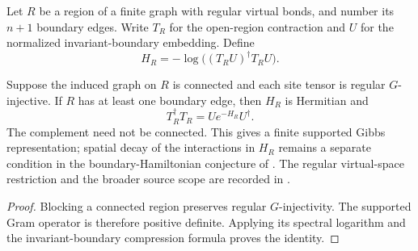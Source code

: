 \begin{definition}%
    \label{def:peps_regular_region_boundary_hamiltonian}
    \leanok
    Let $R$ be a region of a finite graph with regular virtual bonds,
    and number its $n+1$ boundary edges. Write $T_R$ for the
    open-region contraction and $U$ for the normalized invariant-boundary
    embedding. Define
    \[
        H_R=-\log\bigl((T_RU)^\dagger T_RU\bigr).
    \]
\end{definition}

\begin{lemma}%
    \label{thm:peps_regular_region_boundary_hamiltonian}
    \leanok
    Suppose the induced graph on $R$ is connected and each site tensor is
    regular $G$-injective. If $R$ has at least one boundary edge, then
    $H_R$ is Hermitian and
    \[
        T_R^\dagger T_R=Ue^{-H_R}U^\dagger.
    \]
    The complement need not be connected. This gives a finite supported
    Gibbs representation; spatial decay of the interactions in $H_R$
    remains a separate condition in the boundary-Hamiltonian conjecture
    of \cite{Cirac2019OpenProblems}.
    The regular virtual-space restriction and the broader source scope are recorded in
    \cite{gap:rmp_peps_quantum_double_g_isometry}.
\end{lemma}

\begin{proof}\leanok
    Blocking a connected region preserves regular $G$-injectivity.
    The supported Gram operator is therefore positive definite.
    Applying its spectral logarithm and the invariant-boundary
    compression formula proves the identity.
\end{proof}
